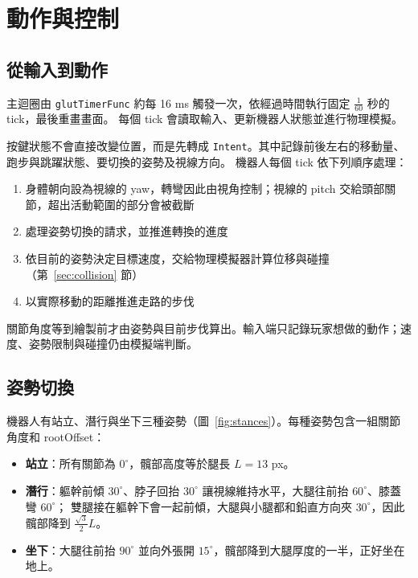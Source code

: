 \section{動作與控制}
\label{sec:motion}

\subsection{從輸入到動作}

主迴圈由 \lstinline|glutTimerFunc| 約每 16 ms 觸發一次，依經過時間執行固定 $\frac{1}{60}$ 秒的 tick，最後重畫畫面。
每個 tick 會讀取輸入、更新機器人狀態並進行物理模擬。

按鍵狀態不會直接改變位置，而是先轉成 \lstinline|Intent|。其中記錄前後左右的移動量、跑步與跳躍狀態、要切換的姿勢及視線方向。
機器人每個 tick 依下列順序處理：

\begin{enumerate}
    \item 身體朝向設為視線的 yaw，轉彎因此由視角控制；視線的 pitch 交給頭部關節，超出活動範圍的部分會被截斷
    \item 處理姿勢切換的請求，並推進轉換的進度
    \item 依目前的姿勢決定目標速度，交給物理模擬器計算位移與碰撞（第~\ref{sec:collision} 節）
    \item 以實際移動的距離推進走路的步伐
\end{enumerate}

關節角度等到繪製前才由姿勢與目前步伐算出。輸入端只記錄玩家想做的動作；速度、姿勢限制與碰撞仍由模擬端判斷。

\subsection{姿勢切換}

機器人有站立、潛行與坐下三種姿勢（圖~\ref{fig:stances}）。每種姿勢包含一組關節角度和 rootOffset：
\begin{itemize}
    \item \textbf{站立}：所有關節為 $0^\circ$，髖部高度等於腿長 $L = 13$ px。
    \item \textbf{潛行}：軀幹前傾 $30^\circ$、脖子回抬 $30^\circ$ 讓視線維持水平，大腿往前抬 $60^\circ$、膝蓋彎 $60^\circ$；
          雙腿接在軀幹下會一起前傾，大腿與小腿都和鉛直方向夾 $30^\circ$，因此髖部降到 $\frac{\sqrt{3}}{2} L$。
    \item \textbf{坐下}：大腿往前抬 $90^\circ$ 並向外張開 $15^\circ$，髖部降到大腿厚度的一半，正好坐在地上。
\end{itemize}


